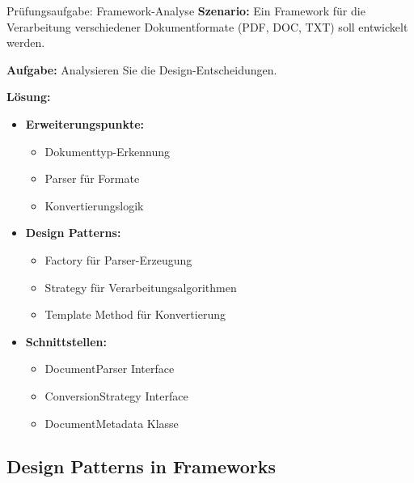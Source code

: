 \begin{example2}{Prüfungsaufgabe: Framework-Analyse}
\textbf{Szenario:}
Ein Framework für die Verarbeitung verschiedener Dokumentformate (PDF, DOC, TXT) 
soll entwickelt werden.

\textbf{Aufgabe:}
Analysieren Sie die Design-Entscheidungen.

\textbf{Lösung:}
\begin{itemize}
    \item \textbf{Erweiterungspunkte:}
    \begin{itemize}
        \item Dokumenttyp-Erkennung
        \item Parser für Formate
        \item Konvertierungslogik
    \end{itemize}
    
    \item \textbf{Design Patterns:}
    \begin{itemize}
        \item Factory für Parser-Erzeugung
        \item Strategy für Verarbeitungsalgorithmen
        \item Template Method für Konvertierung
    \end{itemize}
    
    \item \textbf{Schnittstellen:}
    \begin{itemize}
        \item DocumentParser Interface
        \item ConversionStrategy Interface
        \item DocumentMetadata Klasse
    \end{itemize}
\end{itemize}
\end{example2}

\subsection{Design Patterns in Frameworks}

